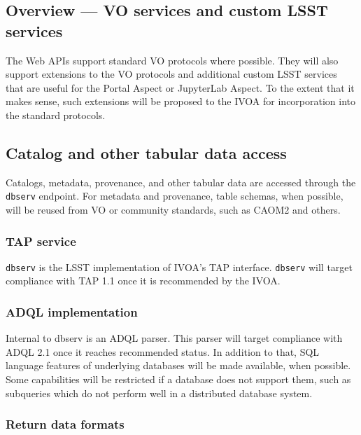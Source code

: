 \subsection{Overview --- VO services and custom LSST services}\label{api-overview}

The Web APIs support standard VO protocols where possible.  They will also
support extensions to the VO protocols and additional custom LSST services that
are useful for the Portal Aspect or JupyterLab Aspect.  To the extent that it
makes sense, such extensions will be proposed to the IVOA for incorporation
into the standard protocols.

\subsection{Catalog and other tabular data access}\label{catalog-and-other-tabular-data-access}

Catalogs, metadata, provenance, and other tabular data are accessed through the
\texttt{dbserv} endpoint. For metadata and provenance, table schemas, when
possible, will be reused from VO or community standards, such as CAOM2
\citep{CAOM2} and others.

\subsubsection{TAP service}\label{tap-and-other-vo-compliant-services}

\texttt{dbserv} is the LSST implementation of IVOA's TAP interface.
\texttt{dbserv} will target compliance with TAP 1.1 once it is recommended
by the IVOA.

\subsubsection{ADQL implementation}\label{adql-implementation}

Internal to dbserv is an ADQL parser. This parser will target compliance with
ADQL 2.1 once it reaches recommended status.  In addition to that, SQL language
features of underlying databases will be made available, when possible.  Some
capabilities will be restricted if a database does not support them, such as
subqueries which do not perform well in a distributed database system.

\subsubsection{Return data formats}\label{return-data-formats}

